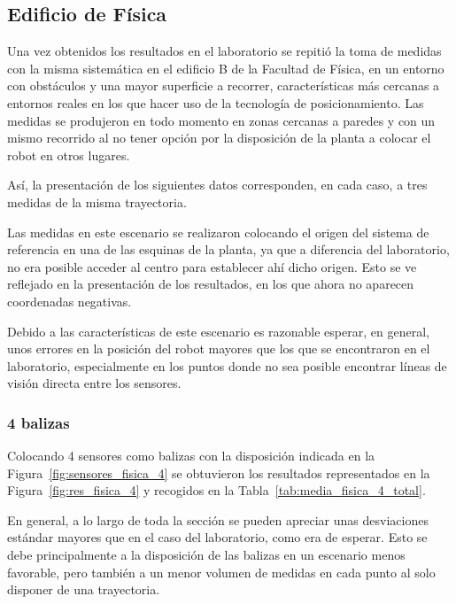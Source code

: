 \newpage
\subsection{Edificio de Física}

Una vez obtenidos los resultados en el laboratorio se repitió la toma de medidas con la misma sistemática en el edificio B de la Facultad de Física, en un entorno con obstáculos y una mayor superficie a recorrer, características más cercanas a entornos reales en los que hacer uso de la tecnología de posicionamiento.
Las medidas se produjeron en todo momento en zonas cercanas a paredes y con un mismo recorrido al no tener opción por la disposición de la planta a colocar el robot en otros lugares.

Así, la presentación de los siguientes datos corresponden, en cada caso, a tres medidas de la misma trayectoria.

Las medidas en este escenario se realizaron colocando el origen del sistema de referencia en una de las esquinas de la planta, ya que a diferencia del laboratorio, no era posible acceder al centro para establecer ahí dicho origen.
Esto se ve reflejado en la presentación de los resultados, en los que ahora no aparecen coordenadas negativas.

Debido a las características de este escenario es razonable esperar, en general, unos errores en la posición del robot mayores que los que se encontraron en el laboratorio, especialmente en los puntos donde no sea posible encontrar líneas de visión directa entre los sensores.

\subsubsection{4 balizas}

Colocando 4 sensores como balizas con la disposición indicada en la Figura~\ref{fig:sensores_fisica_4} se obtuvieron los resultados representados en la Figura~\ref{fig:res_fisica_4} y recogidos en la Tabla~\ref{tab:media_fisica_4_total}.

En general, a lo largo de toda la sección se pueden apreciar unas desviaciones estándar mayores que en el caso del laboratorio, como era de esperar.
Esto se debe principalmente a la disposición de las balizas en un escenario menos favorable, pero también a un menor volumen de medidas en cada punto al solo disponer de una trayectoria.


